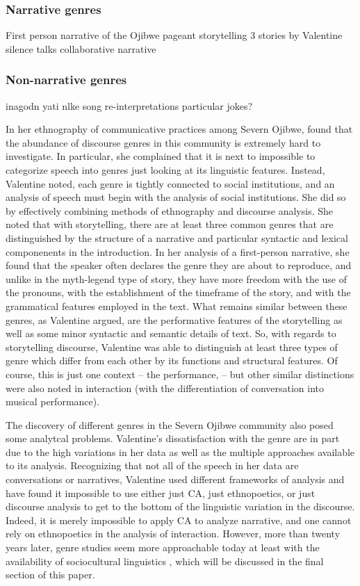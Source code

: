 \documentclass[12pt]{article}
\begin{document}
\subsubsection{Narrative genres}
First person narrative of the Ojibwe
pageant storytelling
3 stories by Valentine
silence talks
collaborative narrative
\subsubsection{Non-narrative genres}
inagodn
yati nlke
song re-interpretations
particular jokes?

In her ethnography of communicative practices among Severn Ojibwe, \textcite{valentine1995} found that the abundance of discourse genres in this community is extremely hard to investigate. In particular, she complained that it is next to impossible to categorize speech into genres just looking at its linguistic features. Instead, Valentine noted, each genre is tightly connected to  social institutions, and an analysis of speech must begin with the analysis of social institutions. She did so by effectively combining methods of ethnography and discourse analysis. She noted that with storytelling, there are at least three common genres that are distinguished by the structure of a narrative and particular syntactic and lexical componenents in the introduction. In her analysis of a first-person narrative, she found that the speaker often declares the genre they are about to reproduce, and unlike in the myth-legend type of story, they have more freedom with the use of the pronouns, with the establishment of the timeframe of the story, and with the grammatical features employed in the text. What remains similar between these genres, as Valentine argued, are the performative features of the storytelling as well as some minor syntactic and semantic details of text. So, with regards to storytelling discourse, Valentine was able to distinguish at least three types of genre which differ from each other by its functions and structural features. Of course, this is just one context -- the performance, -- but other similar distinctions were also noted in interaction (with the differentiation of conversation into musical performance).

The discovery of different genres in the Severn Ojibwe community also posed some analytcal problems. Valentine's dissatisfaction with the genre are in part due to the high variations in her data as well as the multiple approaches available to its analysis. Recognizing that not all of the speech in her data are conversations or narratives, Valentine used different frameworks of analysis and have found it impossible to use either just CA, just ethnopoetics, or just discourse analysis to get to the bottom of the linguistic variation in the discourse. Indeed, it is merely impossible to apply CA to analyze narrative, and one cannot rely on ethnopoetics in the analysis of interaction. However, more than twenty years later, genre studies seem more approachable today at least with the availability of sociocultural linguistics \parencite{bucholtz2008}, which will be discussed in the final section of this paper.
\end{document}
